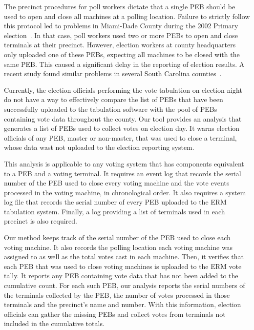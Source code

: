 \label{sec:pebs_not_uploaded}
The precinct procedures for poll workers dictate that a single PEB
should be used to open and close all machines at a polling
location. Failure to strictly follow this protocol led to problems in
Miami-Dade County during the 2002 Primary
election~\cite{Mazella2002}. In that case, poll workers used two or
more PEBs to open and close terminals at their precinct.  However,
election workers at county headquarters only uploaded one of these
PEBs, expecting all machines to be closed with the same PEB. This
caused a significant delay in the reporting of election results. A
recent study found similar problems in several South Carolina
counties~\cite{Buell2011}.

Currently, the election officials performing the vote tabulation on
election night do not have a way to effectively compare the list of
PEBs that have been successfully uploaded to the tabulation software
with the pool of PEBs containing vote data throughout the county. Our
tool provides an analysis that generates a list of PEBs used to collect
votes on election day. It warns election officials of any PEB, master
or non-master, that was used to close a terminal, whose data wast not
uploaded to the election reporting system.  

This analysis is applicable to any voting system that has components
equivalent to a PEB and a voting terminal.  It requires an event log
that records the serial number of the PEB used to close every voting
machine and the vote events processed in the voting machine, in
chronological order. It also requires a system log file that records the
serial number of every PEB uploaded to the ERM tabulation
system. Finally, a log providing a list of terminals used in each
precinct is also required.

Our method keeps track of the serial number of the PEB used to close each voting
machine. It also records the polling location each voting machine was assigned
to as well as the total votes cast in each machine. Then, it verifies that each
PEB that was used to close voting machines is uploaded to the ERM vote tally. It
reports any PEB containing vote data that has not been added to the cumulative
count.  For each such PEB, our analysis reports the serial numbers of the
terminals collected by the PEB, the number of votes processed in those terminals
and the precinct's name and number. With this information, election officials
can gather the missing PEBs and collect votes from terminals not included in the
cumulative totals.

